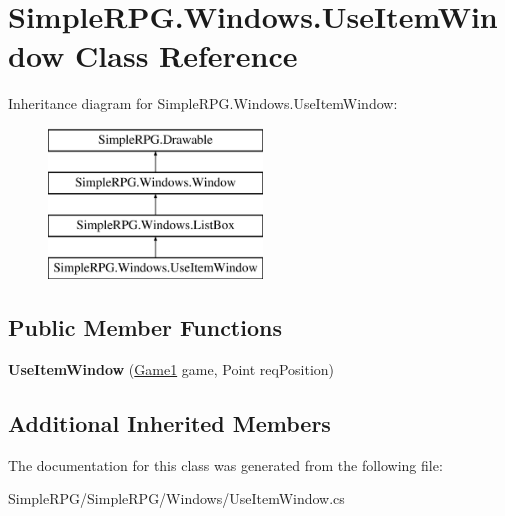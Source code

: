 \hypertarget{class_simple_r_p_g_1_1_windows_1_1_use_item_window}{\section{Simple\-R\-P\-G.\-Windows.\-Use\-Item\-Window Class Reference}
\label{class_simple_r_p_g_1_1_windows_1_1_use_item_window}
}
Inheritance diagram for Simple\-R\-P\-G.\-Windows.\-Use\-Item\-Window\-:\begin{figure}[H]
\begin{center}
\leavevmode
\includegraphics[height=4.000000cm]{class_simple_r_p_g_1_1_windows_1_1_use_item_window}
\end{center}
\end{figure}
\subsection*{Public Member Functions}
\begin{DoxyCompactItemize}
\item 
\hypertarget{class_simple_r_p_g_1_1_windows_1_1_use_item_window_a4eba542441bee99f975409f2d39ccfdd}{{\bfseries Use\-Item\-Window} (\hyperlink{class_simple_r_p_g_1_1_game1}{Game1} game, Point req\-Position)}\label{class_simple_r_p_g_1_1_windows_1_1_use_item_window_a4eba542441bee99f975409f2d39ccfdd}

\end{DoxyCompactItemize}
\subsection*{Additional Inherited Members}


The documentation for this class was generated from the following file\-:\begin{DoxyCompactItemize}
\item 
Simple\-R\-P\-G/\-Simple\-R\-P\-G/\-Windows/Use\-Item\-Window.\-cs\end{DoxyCompactItemize}
